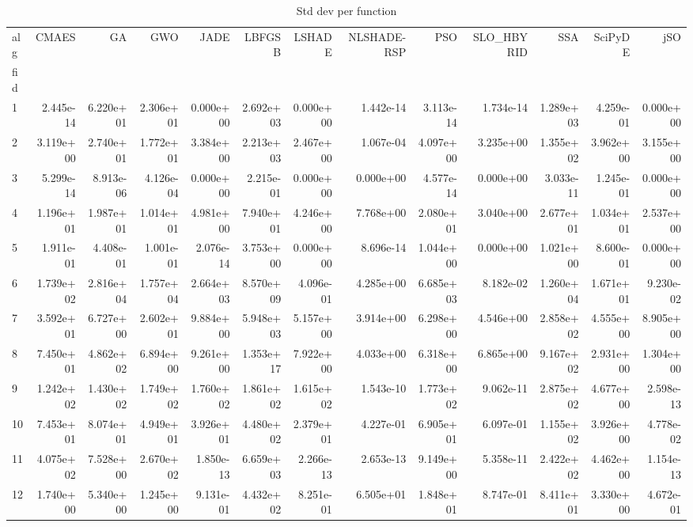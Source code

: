 \begin{table}
\caption{Std dev per function}
\label{tab:std_all}
\begin{tabular}{lrrrrrrrrrrrr}
\toprule
alg & CMAES & GA & GWO & JADE & LBFGSB & LSHADE & NLSHADE-RSP & PSO & SLO_HBYRID & SSA & SciPyDE & jSO \\
fid &  &  &  &  &  &  &  &  &  &  &  &  \\
\midrule
1 & 2.445e-14 & 6.220e+01 & 2.306e+01 & 0.000e+00 & 2.692e+03 & 0.000e+00 & 1.442e-14 & 3.113e-14 & 1.734e-14 & 1.289e+03 & 4.259e-01 & 0.000e+00 \\
2 & 3.119e+00 & 2.740e+01 & 1.772e+01 & 3.384e+00 & 2.213e+03 & 2.467e+00 & 1.067e-04 & 4.097e+00 & 3.235e+00 & 1.355e+02 & 3.962e+00 & 3.155e+00 \\
3 & 5.299e-14 & 8.913e-06 & 4.126e-04 & 0.000e+00 & 2.215e-01 & 0.000e+00 & 0.000e+00 & 4.577e-14 & 0.000e+00 & 3.033e-11 & 1.245e-01 & 0.000e+00 \\
4 & 1.196e+01 & 1.987e+01 & 1.014e+01 & 4.981e+00 & 7.940e+01 & 4.246e+00 & 7.768e+00 & 2.080e+01 & 3.040e+00 & 2.677e+01 & 1.034e+01 & 2.537e+00 \\
5 & 1.911e-01 & 4.408e-01 & 1.001e-01 & 2.076e-14 & 3.753e+00 & 0.000e+00 & 8.696e-14 & 1.044e+00 & 0.000e+00 & 1.021e+00 & 8.600e-01 & 0.000e+00 \\
6 & 1.739e+02 & 2.816e+04 & 1.757e+04 & 2.664e+03 & 8.570e+09 & 4.096e-01 & 4.285e+00 & 6.685e+03 & 8.182e-02 & 1.260e+04 & 1.671e+01 & 9.230e-02 \\
7 & 3.592e+01 & 6.727e+00 & 2.602e+01 & 9.884e+00 & 5.948e+03 & 5.157e+00 & 3.914e+00 & 6.298e+00 & 4.546e+00 & 2.858e+02 & 4.555e+00 & 8.905e+00 \\
8 & 7.450e+01 & 4.862e+02 & 6.894e+00 & 9.261e+00 & 1.353e+17 & 7.922e+00 & 4.033e+00 & 6.318e+00 & 6.865e+00 & 9.167e+02 & 2.931e+00 & 1.304e+00 \\
9 & 1.242e+02 & 1.430e+02 & 1.749e+02 & 1.760e+02 & 1.861e+02 & 1.615e+02 & 1.543e-10 & 1.773e+02 & 9.062e-11 & 2.875e+02 & 4.677e+00 & 2.598e-13 \\
10 & 7.453e+01 & 8.074e+01 & 4.949e+01 & 3.926e+01 & 4.480e+02 & 2.379e+01 & 4.227e-01 & 6.905e+01 & 6.097e-01 & 1.155e+02 & 3.926e+00 & 4.778e-02 \\
11 & 4.075e+02 & 7.528e+00 & 2.670e+02 & 1.850e-13 & 6.659e+03 & 2.266e-13 & 2.653e-13 & 9.149e+00 & 5.358e-11 & 2.422e+02 & 4.462e+00 & 1.154e-13 \\
12 & 1.740e+00 & 5.340e+00 & 1.245e+00 & 9.131e-01 & 4.432e+02 & 8.251e-01 & 6.505e+01 & 1.848e+01 & 8.747e-01 & 8.411e+01 & 3.330e+00 & 4.672e-01 \\
\bottomrule
\end{tabular}
\end{table}
